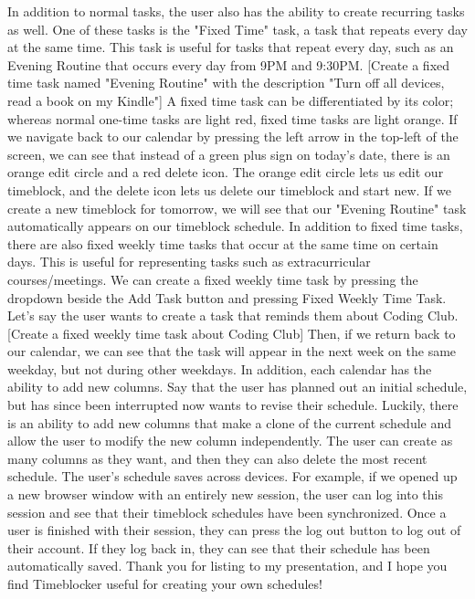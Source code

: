 \documentclass[notitlepage]{report}
\begin{document}
In addition to normal tasks, the user also has the ability to create recurring tasks as well. One of these tasks is the "Fixed Time" task, a task that repeats every day at the same time. This task is useful for tasks that repeat every day, such as an Evening Routine that occurs every day from 9PM and 9:30PM.
[Create a fixed time task named "Evening Routine" with the description "Turn off all devices, read a book on my Kindle"]
A fixed time task can be differentiated by its color; whereas normal one-time tasks are light red, fixed time tasks are light orange.
If we navigate back to our calendar by pressing the left arrow in the top-left of the screen, we can see that instead of a green plus sign on today's date, there is an orange edit circle and a red delete icon. The orange edit circle lets us edit our timeblock, and the delete icon lets us delete our timeblock and start new.
If we create a new timeblock for tomorrow, we will see that our "Evening Routine" task automatically appears on our timeblock schedule.
In addition to fixed time tasks, there are also fixed weekly time tasks that occur at the same time on certain days. This is useful for representing tasks such as extracurricular courses/meetings. We can create a fixed weekly time task by pressing the dropdown beside the Add Task button and pressing Fixed Weekly Time Task. Let's say the user wants to create a task that reminds them about Coding Club.
[Create a fixed weekly time task about Coding Club]
Then, if we return back to our calendar, we can see that the task will appear in the next week on the same weekday, but not during other weekdays.
In addition, each calendar has the ability to add new columns. Say that the user has planned out an initial schedule, but has since been interrupted now wants to revise their schedule. Luckily, there is an ability to add new columns that make a clone of the current schedule and allow the user to modify the new column independently.
The user can create as many columns as they want, and then they can also delete the most recent schedule.
The user's schedule saves across devices. For example, if we opened up a new browser window with an entirely new session, the user can log into this session and see that their timeblock schedules have been synchronized.
Once a user is finished with their session, they can press the log out button to log out of their account. If they log back in, they can see that their schedule has been automatically saved.
Thank you for listing to my presentation, and I hope you find Timeblocker useful for creating your own schedules!
\end{document}
